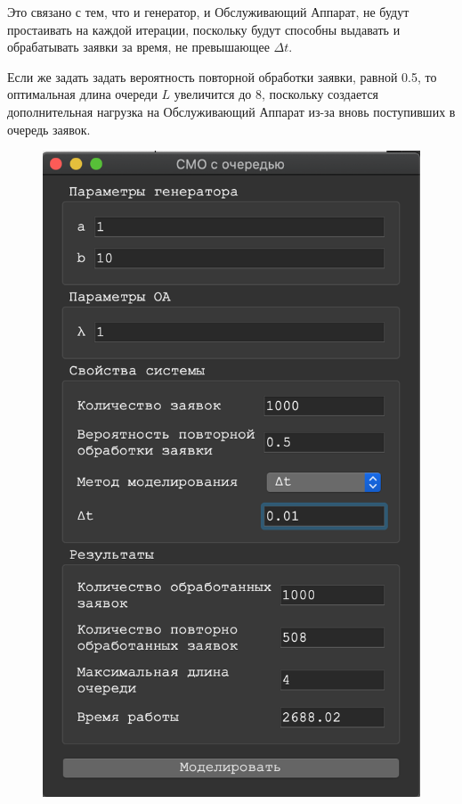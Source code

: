 \documentclass[a4paper,12pt]{article}
\begin{document}
	Это связано с тем, что и генератор, и Обслуживающий Аппарат, не будут простаивать на каждой итерации, поскольку будут способны выдавать и обрабатывать заявки за время, не превышающее $\Delta t$.
	
	\newpage
	
	Если же задать задать вероятность повторной обработки заявки, равной 0.5, то оптимальная длина очереди $L$ увеличится до 8, поскольку создается дополнительная нагрузка на Обслуживающий Аппарат из-за вновь поступивших в очередь заявок.
	
	\begin{figure}[h!]
		\begin{minipage}[b]{0.32\textwidth}
			\includegraphics[width=\textwidth]{deltat_3_1.png}

\end{minipage}
\end{figure}
\end{document}
